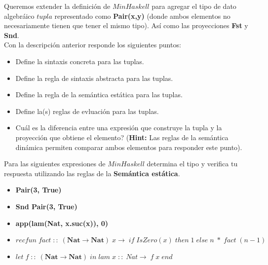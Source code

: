     \bigskip

    \begin{exercise}
        Queremos extender la definición de $MinHaskell$ para agregar el tipo de dato algebráico $tupla$ representado como \textbf{Pair(x,y)} (donde ambos elementos no necesariamente tienen que tener el mismo tipo). Así como las proyecciones \textbf{Fst} y \textbf{Snd}.\\

        Con  la descripción anterior responde los siguientes puntos:
        \begin{itemize}
            \item Define la sintaxis concreta para las tuplas.
            \item Define la regla de sintaxis abstracta para las tuplas.
            \item Define la regla de la semántica estática para las tuplas.
            \item Define la(s) reglas de evluación para las tuplas.
            \item Cuál es la diferencia entre una expresión que construye la tupla y la proyección que obtiene el elemento? (\textbf{Hint: } Las reglas de la semántica dinámica permiten comparar ambos elementos para responder este punto).
        \end{itemize}
    \end{exercise}

    \bigskip

    \begin{exercise}
        Para las siguientes expresiones de $MinHaskell$ determina el tipo y verifica tu respuesta utilizando las reglas de la \textbf{Semántica estática}.\\
        
        \begin{itemize}
            \item \textbf{Pair(3, True)}
            \item \textbf{Snd Pair(3, True)}
            \item \textbf{app(lam(Nat, x.suc(x)), 0)}  
            \item  \textbf{$recfun\; fact\; ::\; (\textbf{Nat} \rightarrow \textbf{Nat})\; x \rightarrow\; if\; IsZero(x)\; then\; 1\; else\; n\; *\; fact\; (n-1)$}
            \item  \textbf{$ let\; f\; ::\; (\textbf{Nat} \rightarrow \textbf{Nat})\; in\; lam\; x\; ::\; Nat \rightarrow\; f\; x\; end$}
        \end{itemize}
    \end{exercise}

